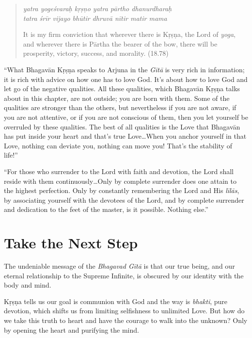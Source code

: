 \documentclass[12pt, twoside, openright]{memoir}
\begin{document}
\par
\begin{verse}
\textit{yatra yogeśvaraḥ kṛṣṇo yatra pārtho dhanurdharaḥ} \\
\textit{tatra śrīr vijayo bhūtir dhruvā nītir matir mama}

\noindent It is my firm conviction that wherever there is Kṛṣṇa, the Lord of \textit{yoga}, and wherever there is Pārtha the bearer of the bow, there will be prosperity, victory, success, and morality. (18.78)
\end{verse}
\par


\enquote{What Bhagavān Kṛṣṇa speaks to Arjuna in the \textit{Gītā} is very rich in information; it is rich with advice on how one has to love God. It’s about how to love God and let go of the negative qualities. All these qualities, which Bhagavān Kṛṣṇa talks about in this chapter, are not outside; you are born with them. Some of the qualities are stronger than the others, but nevertheless if you are not aware, if you are not attentive, or if you are not conscious of them, then you let yourself be overruled by these qualities. The best of all qualities is the Love that Bhagavān has put inside your heart and that’s true Love\ldots When you anchor yourself in that Love, nothing can deviate you, nothing can move you! That’s the stability of life!}

\enquote{For those who surrender to the Lord with faith and devotion, the Lord shall reside with them continuously\ldots Only by complete surrender does one attain to the highest perfection. Only by constantly remembering the Lord and His \textit{līlās}, by associating yourself with the devotees of the Lord, and by complete surrender and dedication to the feet of the master, is it possible. Nothing else.}
 \chapter*{Take the Next Step}\label{chap-take-the-next-step}

The undeniable message of the \textit{Bhagavad Gītā} is that our true being, and our eternal relationship to the Supreme Infinite, is obscured by our identity with the body and mind.

Kṛṣṇa tells us our goal is communion with God and the way is \textit{bhakti}, pure devotion, which shifts us from limiting selfishness to unlimited Love. But how do we take this truth to heart and have the courage to walk into the unknown? Only by opening the heart and purifying the mind. 
\end{document}
